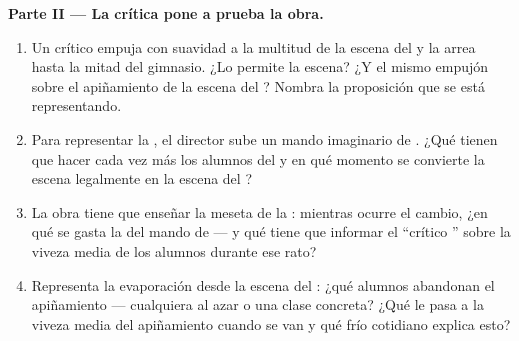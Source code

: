 \begin{problem}
\medskip\noindent\textbf{Parte II --- La crítica pone a prueba la
obra.}
\begin{enumerate}[resume]
  \item Un crítico empuja con suavidad a la multitud de la escena del
         y la arrea hasta la mitad del gimnasio. ¿Lo permite la
        escena? ¿Y el mismo empujón sobre el apiñamiento de la escena
        del ? Nombra la proposición que se está
        representando.
  \item Para representar la \emph{}, el director sube un mando
        imaginario de . ¿Qué tienen que hacer cada vez más los
        alumnos del  y en qué momento se convierte la escena
        legalmente en la escena del ?
  \item La obra tiene que enseñar la meseta de la : mientras
        ocurre el cambio, ¿en qué se gasta la  del mando de
         --- y qué tiene que informar el ``crítico
        '' sobre la viveza media de los alumnos durante
        ese rato?
  \item Representa la evaporación desde la escena del : ¿qué
        alumnos abandonan el apiñamiento --- cualquiera al azar o una
        clase concreta? ¿Qué le pasa a la viveza media del
        apiñamiento cuando se van y qué frío cotidiano explica esto?
\end{enumerate}


\end{problem}
